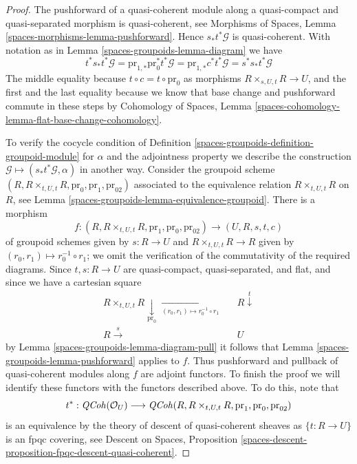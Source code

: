 \begin{proof}
The pushforward of a quasi-coherent module along a quasi-compact and
quasi-separated morphism is quasi-coherent, see
Morphisms of Spaces, Lemma \ref{spaces-morphisms-lemma-pushforward}.
Hence $s_*t^*\mathcal{G}$
is quasi-coherent. With notation as in Lemma \ref{spaces-groupoids-lemma-diagram} we have
$$
t^*s_*t^*\mathcal{G} =
\text{pr}_{1, *}\text{pr}_0^*t^*\mathcal{G} =
\text{pr}_{1, *}c^*t^*\mathcal{G} =
s^*s_*t^*\mathcal{G}
$$
The middle equality because $t \circ c = t \circ \text{pr}_0$ as
morphisms $R \times_{s, U, t} R \to U$, and the first and the last
equality because we know that base change and pushforward commute in
these steps by
Cohomology of Spaces, Lemma
\ref{spaces-cohomology-lemma-flat-base-change-cohomology}.

\medskip\noindent
To verify the cocycle condition of Definition \ref{spaces-groupoids-definition-groupoid-module}
for $\alpha$ and the adjointness property we describe the construction
$\mathcal{G} \mapsto (s_*t^*\mathcal{G}, \alpha)$ in another way.
Consider the groupoid scheme
$(R, R \times_{t, U, t} R, \text{pr}_0, \text{pr}_1, \text{pr}_{02})$
associated to the equivalence relation $R \times_{t, U, t} R$
on $R$, see Lemma \ref{spaces-groupoids-lemma-equivalence-groupoid}.
There is a morphism
$$
f :
(R, R \times_{t, U, t} R, \text{pr}_1, \text{pr}_0, \text{pr}_{02})
\longrightarrow
(U, R, s, t, c)
$$
of groupoid schemes given by $s : R \to U$ and $R \times_{t, U, t} R \to R$
given by $(r_0, r_1) \mapsto r_0^{-1} \circ r_1$; we omit the verification
of the commutativity of the required diagrams. Since
$t, s : R \to U$ are quasi-compact, quasi-separated, and flat,
and since we have a cartesian square
$$
\begin{array}{ccc}R \times_{t, U, t} R \underset{\text{pr}_0}{\downarrow}\underset{(r_0, r_1) \mapsto r_0^{-1} \circ r_1}{\longrightarrow} &  & R \overset{t}{\downarrow} \\ R \overset{s}{\longrightarrow} &  & U\end{array}
$$
by Lemma \ref{spaces-groupoids-lemma-diagram-pull} it follows that
Lemma \ref{spaces-groupoids-lemma-pushforward} applies to $f$.
Thus pushforward and pullback of quasi-coherent modules along
$f$ are adjoint functors. To finish the proof we will identify these functors
with the functors described above. To do this, note that
$$
t^* :
\mathit{QCoh}(\mathcal{O}_U)
\longrightarrow
\mathit{QCoh}(R, R \times_{t, U, t} R, \text{pr}_1, \text{pr}_0, \text{pr}_{02})
$$
is an equivalence by the theory of descent of quasi-coherent sheaves as
$\{t : R \to U\}$ is an fpqc covering, see
Descent on Spaces, Proposition
\ref{spaces-descent-proposition-fpqc-descent-quasi-coherent}.


\end{proof}
